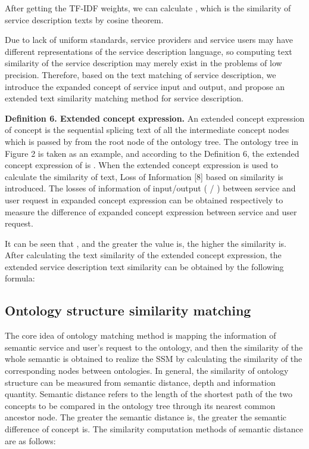 \documentclass{ieeeaccess}
\begin{document}
After getting the TF-IDF weights, we can calculate  , which is the similarity of service description texts by cosine theorem.

Due to lack of uniform standards, service providers and service users may have different representations of the service description language, so computing text similarity of the service description may merely exist in the problems of low precision. Therefore, based on the text matching of service description, we introduce the expanded concept of service input and output, and propose an extended text similarity matching method for service description.

\textbf{Definition 6. Extended concept expression.} An extended concept expression of concept is the sequential splicing text of all the intermediate concept nodes which is passed by from the root node of the ontology tree. 
The ontology tree in Figure 2 is taken as an example, and according to the Definition 6, the extended concept expression of   is  . When the extended concept expression is used to calculate the similarity of text, Loss of Information [8] based on similarity is introduced. The losses of information of input/output ( / ) between service and user request in expanded concept expression can be obtained respectively to measure the difference of expanded concept expression between service and user request.
 
It can be seen that  , and the greater the value is, the higher the similarity is. After calculating the text similarity of the extended concept expression, the extended service description text similarity can be obtained by the following formula:
 
\subsection{Ontology structure similarity matching}
The core idea of ontology matching method is mapping the information of semantic service and user's request to the ontology, and then the similarity of the whole semantic is obtained to realize the SSM by calculating the similarity of the corresponding nodes between ontologies. In general, the similarity of ontology structure can be measured from semantic distance, depth and information quantity.
Semantic distance refers to the length of the shortest path of the two concepts to be compared in the ontology tree through its nearest common ancestor node. The greater the semantic distance is, the greater the semantic difference of concept is. The similarity computation methods of semantic distance are as follows:
 
\end{document}
